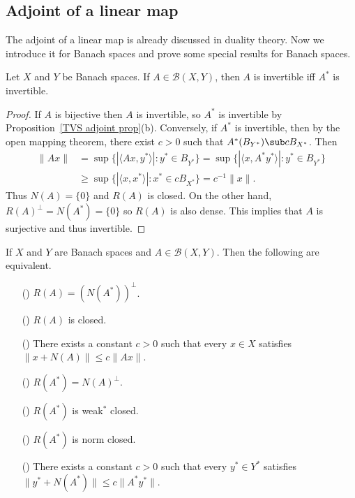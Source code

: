 \subsection{Adjoint of a linear map}
The adjoint of a linear map is already discussed in duality theory. Now we introduce it for Banach spaces and prove some special results for Banach spaces.
\begin{proposition}\label{Banach space map invertible iff adjoint invertible}
Let $X$ and $Y$ be Banach spaces. If $A\in\mathcal{B}(X,Y)$, then $A$ is invertible iff $A^*$ is invertible.
\end{proposition}
\begin{proof}
If $A$ is bijective then $A$ is invertible, so $A^*$ is invertible by Proposition~\ref{TVS adjoint prop}(b). Conversely, if $A^*$ is invertible, then by the open mapping theorem, there exist $c>0$ such that $A^*(B_{Y^*})\sub cB_{X^*}$. Then
\begin{align*}
\|Ax\|&=\sup\{|\langle Ax,y^*\rangle|:y^*\in B_{Y^*}\}=\sup\{|\langle x,A^*y^*\rangle|:y^*\in B_{Y^*}\}\\
&\geq\sup\{|\langle x,x^*\rangle|:x^*\in cB_{X^*}\}=c^{-1}\|x\|.
\end{align*}
Thus $N(A)=\{0\}$ and $R(A)$ is closed. On the other hand, $R(A)^\bot=N(A^*)=\{0\}$ so $R(A)$ is also dense. This implies that $A$ is surjective and thus invertible.
\end{proof}
\begin{theorem}
If $X$ and $Y$ are Banach spaces and $A\in\mathcal{B}(X,Y)$. Then the following are equivalent.
\begin{itemize}
\item[(\rmnum{1})] $R(A)=(N(A^*))^\bot$.
\item[(\rmnum{2})] $R(A)$ is closed.
\item[(\rmnum{3})] There exists a constant $c>0$ such that every $x\in X$ satisfies $\|x+N(A)\|\leq c\|Ax\|$. 
\item[(\rmnum{4})] $R(A^*)=N(A)^\bot$.
\item[(\rmnum{5})] $R(A^*)$ is weak$^*$ closed.
\item[(\rmnum{6})] $R(A^*)$ is norm closed.
\item[(\rmnum{7})] There exists a constant $c>0$ such that every $y^*\in Y^*$ satisfies $\|y^*+N(A^*)\|\leq c\|A^*y^*\|$.  
\end{itemize}
\end{theorem}
